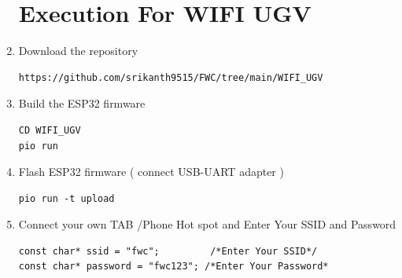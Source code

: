 \begin{enumerate}[label=\thesection.\arabic*.,ref=\thesection.\theenumi]
\section{Execution For WIFI UGV}
\raggedright
\item Download the repository
\begin{lstlisting}
https://github.com/srikanth9515/FWC/tree/main/WIFI_UGV
\end{lstlisting}

\item Build the ESP32 firmware
\begin{lstlisting}
CD WIFI_UGV
pio run
\end{lstlisting} 

\item Flash ESP32 firmware ( connect USB-UART adapter )
\begin{lstlisting}
pio run -t upload
\end{lstlisting} 

\item Connect your own TAB /Phone Hot spot and  Enter Your SSID and  Password
\begin{lstlisting}
const char* ssid = "fwc";         /*Enter Your SSID*/ 
const char* password = "fwc123"; /*Enter Your Password*
\end{lstlisting} 
\end{enumerate}